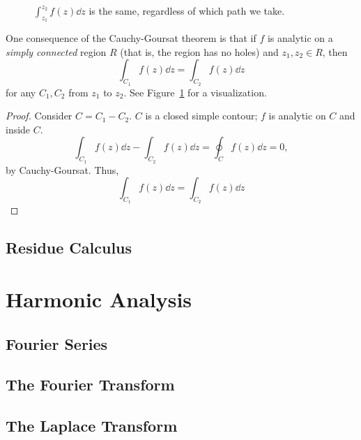 \documentclass[10pt]{scrartcl}
\numberwithin{equation}{subsection}
\theoremstyle{definition}
\theoremstyle{remark}
\begin{document}
\begin{figure}
	\centering
	\caption{$\int_{z_1}^{z_2} f(z)\dd{z}$ is the same, regardless of which path
	we take.}
	\label{fig:pathind}
\end{figure}
One consequence of the Cauchy-Goursat theorem is that if $f$ is analytic
on a \textit{simply connected}  region $R$ (that is, the region has no holes)
and $z_1, z_2 \in R$, then 
\[
	\int_{C_1} f(z)\dd{z} = \int_{C_2} f(z)\dd{z}
\]
for any $C_1, C_2$ from $z_1$ to $z_2$. See Figure~\ref{fig:pathind} for a 
visualization.
\begin{proof}
	Consider $C=C_1 - C_2$. $C$ is a closed simple contour; $f$ is analytic 
	on $C$ and inside $C$.
	\[
		\int_{C_1} f(z)\dd{z} - \int_{C_2} f(z) \dd{z} = \oint_C f(z) \dd{z} = 0,
	\]
	by Cauchy-Goursat. Thus,	
	\[
		\int_{C_1} f(z)\dd{z} = \int_{C_2} f(z) \dd{z} 
	\]
\end{proof}
\subsection{Residue Calculus}
\section{Harmonic Analysis}
\label{HarmonicAnalysis}
\subsection{Fourier Series}
\subsection{The Fourier Transform}
\subsection{The Laplace Transform}
\end{document}
